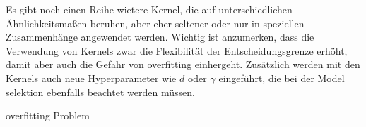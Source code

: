\documentclass[
]{article}
\begin{document}
Es gibt noch einen Reihe wietere Kernel, die auf unterschiedlichen
Ähnlichkeitsmaßen beruhen, aber eher seltener oder nur in speziellen
Zusammenhänge angewendet werden. Wichtig ist anzumerken, dass die
Verwendung von Kernels zwar die Flexibilität der Entscheidungsgrenze
erhöht, damit aber auch die Gefahr von overfitting einhergeht.
Zusätzlich werden mit den Kernels auch neue Hyperparameter wie \(d\)
oder \(\gamma\) eingeführt, die bei der Model selektion ebenfalls
beachtet werden müssen.

overfitting Problem

\printbibliography
\end{document}
